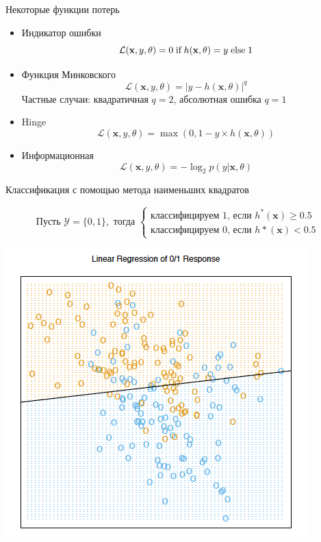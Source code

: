 \documentclass[aspectratio=169]{beamer}
\begin{document}
\begin{frame}{Некоторые функции потерь}

\begin{itemize}
\item Индикатор ошибки
\[
\mathcal{L}(\mathbf{x}, y, \theta) = 0 \text{\;if\;} h(\mathbf{x}, \theta) = y \text{\;else\;} 1
\]
\item Функция Минковского 
\[
\mathcal{L}(\mathbf{x}, y, \theta) = |y - h(\mathbf{x}, \theta)|^q
\]
Частные случаи: квадратичная $q = 2$, абсолютная ошибка $q = 1$
\item Hinge
\[
\mathcal{L}(\mathbf{x}, y, \theta) = \max(0, 1 - y \times h(\mathbf{x}, \theta))
\]
\item Информационная
\[
\mathcal{L}(\mathbf{x}, y, \theta) = - \log_2 p(y | \mathbf{x}, \theta)
\]
\begin{center}

\end{center}
\end{itemize}

\end{frame}

\begin{frame}{Классификация с помощью метода наименьших квадратов}

\[
\text{Пусть }\mathcal{Y} = \{0, 1\}, \text{ тогда } \begin{cases}
\text{классифицируем 1, если }h^*(\mathbf{x}) \geq 0.5 \\
\text{классифицируем 0, если }h*(\mathbf{x}) < 0.5
\end{cases}
\]

\begin{center}
\includegraphics[height=0.5\textheight]{images/lr_cls.png}
\end{center}

\end{frame}
\end{document}
